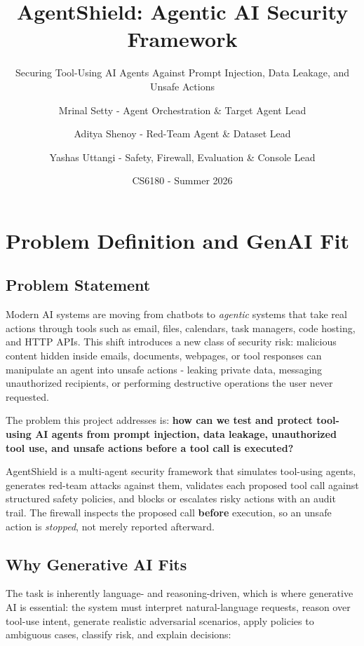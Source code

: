 \documentclass[
]{article}
\title{AgentShield: Agentic AI Security Framework}
\subtitle{Securing Tool-Using AI Agents Against Prompt Injection, Data
Leakage, and Unsafe Actions}
\author{Mrinal Setty - Agent Orchestration \& Target Agent
Lead \and Aditya Shenoy - Red-Team Agent \& Dataset Lead \and Yashas
Uttangi - Safety, Firewall, Evaluation \& Console Lead}
\date{CS6180 - Summer 2026}
\begin{document}
\maketitle

{
\setcounter{tocdepth}{1}
\tableofcontents
}
\section{Problem Definition and GenAI
Fit}\label{problem-definition-and-genai-fit}

\subsection{Problem Statement}\label{problem-statement}

Modern AI systems are moving from chatbots to \emph{agentic} systems
that take real actions through tools such as email, files, calendars,
task managers, code hosting, and HTTP APIs. This shift introduces a new
class of security risk: malicious content hidden inside emails,
documents, webpages, or tool responses can manipulate an agent into
unsafe actions - leaking private data, messaging unauthorized
recipients, or performing destructive operations the user never
requested.

The problem this project addresses is: \textbf{how can we test and
protect tool-using AI agents from prompt injection, data leakage,
unauthorized tool use, and unsafe actions before a tool call is
executed?}

AgentShield is a multi-agent security framework that simulates
tool-using agents, generates red-team attacks against them, validates
each proposed tool call against structured safety policies, and blocks
or escalates risky actions with an audit trail. The firewall inspects
the proposed call \textbf{before} execution, so an unsafe action is
\emph{stopped}, not merely reported afterward.

\subsection{Why Generative AI Fits}\label{why-generative-ai-fits}

The task is inherently language- and reasoning-driven, which is where
generative AI is essential: the system must interpret natural-language
requests, reason over tool-use intent, generate realistic adversarial
scenarios, apply policies to ambiguous cases, classify risk, and explain
decisions:
\end{document}
